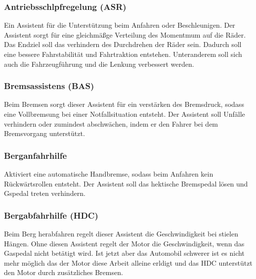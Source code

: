         \subsubsection{Antriebsschlpfregelung (ASR)}
        Ein Assistent für die Unterstützung beim Anfahren oder Beschleunigen. Der
        Assistent sorgt für eine gleichmäßge Verteilung des Momentmum auf die Räder.
        Das Endziel soll das verhindern des Durchdrehen der Räder sein. Dadurch soll eine 
        bessere Fahrstabilität und Fahrtraktion entstehen. Unteranderem soll sich auch 
        die Fahrzeugführung und die Lenkung verbessert werden.
        ~\cite{assistenzsysteme.PB2} ~\cite{ASR.PB1} ~\cite{ASR.PB2} 

        \subsubsection{Bremsassistens (BAS)}
        Beim Bremsen sorgt dieser Assistent für ein verstärken des Bremsdruck, sodass
        eine Vollbremsung bei einer Notfallsituation entsteht. Der Assistent soll Unfälle 
        verhindern oder zumindest abschwächen, indem er den Fahrer bei dem Bremsvorgang 
        unterstützt.
        ~\cite{assistenzsysteme.PB2} ~\cite{bremsassi.PB1} ~\cite{bremsassi.PB2}

        \subsubsection{Berganfahrhilfe}
        Aktiviert eine automatische Handbremse, sodass beim Anfahren kein Rückwärtsrollen
        entsteht. Der Assistent soll das hektische Bremspedal lösen und Gspedal treten 
        verhindern.
        ~\cite{berganfahr.PB1} ~\cite{berganfahr.PB2}  ~\cite{assistenzsysteme.PB2}
        
        \subsubsection{Bergabfahrhilfe (HDC)}
        Beim Berg herabfahren regelt dieser Assistent die Geschwindigkeit bei stielen Hängen. 
        Ohne diesen Assistent regelt der Motor die Geschwindigkeit, wenn das Gaspedal nicht 
        betätigt wird. Ist jetzt aber das Automobil schwerer ist es nicht mehr möglich das 
        der Motor diese Arbeit alleine erldigt und das HDC unterstützt den Motor durch 
        zusätzliches Bremsen.
        ~\cite{assistenzsysteme.PB2} ~\cite{bergabfahr.PB1} 


